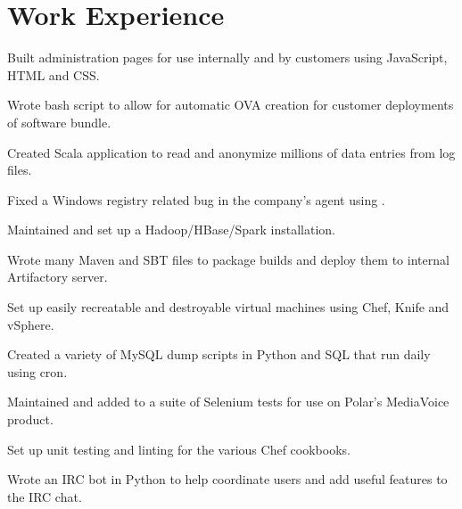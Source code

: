 \documentclass[letterpaper]{deedy-resume-modified} %
\begin{document}
\begin{minipage}[t]{0.66\textwidth} %


\section{Work Experience}


\vspace{\topsep} %
\begin{tightitemize}
\item Built administration pages for use internally and by customers using JavaScript, HTML and CSS.
\item Wrote bash script to allow for automatic OVA creation for customer deployments of software bundle.
\item Created Scala application to read and anonymize millions of data entries from log files.
\item Fixed a Windows registry related bug in the company's agent using \CPP.
\item Maintained and set up a Hadoop/HBase/Spark installation.
\item Wrote many Maven and SBT files to package builds and deploy them to internal Artifactory server.
\end{tightitemize}

\sectionspace %



\begin{tightitemize}
\item Set up easily recreatable and destroyable virtual machines using Chef, Knife and vSphere.
\item Created a variety of MySQL dump scripts in Python and SQL that run daily using cron.
\item Maintained and added to a suite of Selenium tests for use on Polar's MediaVoice product.
\item Set up unit testing and linting for the various Chef cookbooks.
\item Wrote an IRC bot in Python to help coordinate users and add useful features to the IRC chat.
\end{tightitemize}


\end{minipage}
\end{document}
